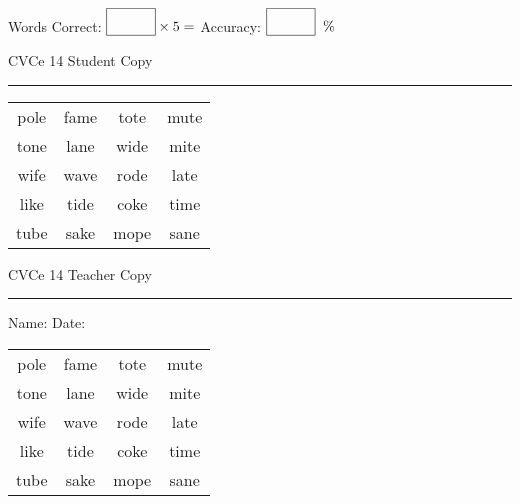 \documentclass{memoir}
\begin{document}
\small

Words Correct: $\fbox{\phantom{\huge 100}} \times 5 = $ Accuracy: $\fbox{\phantom{\huge 100}}\;\; \%$ 

\vfill

\newpage


\footnotesize \noindent
CVCe 14 \hfill Student Copy
\smallskip
\hrule

\Large

\setlength{\tabcolsep}{14pt}
\def\arraystretch{2}

{\selectfont


\begin{vplace}[0.5]
\begin{center}
\begin{tabular}{cccc}
pole & fame & tote & mute \\
tone & lane & wide & mite \\
wife & wave & rode & late \\
like & tide & coke & time \\
tube & sake & mope & sane \\
\end{tabular}
\end{center}
\end{vplace}

}

\newpage

\footnotesize \noindent
CVCe 14 \hfill Teacher Copy
\smallskip
\hrule

\small

\vfill

\noindent
Name: \underline{\hspace{1.75in}} \hfill Date: \underline{\hspace{1in}}

\Large

{\selectfont


\begin{vplace}[0.5]
\begin{center}
\begin{tabular}{cccc}
pole & fame & tote & mute \\
tone & lane & wide & mite \\
wife & wave & rode & late \\
like & tide & coke & time \\
tube & sake & mope & sane \\
\end{tabular}
\end{center}
\end{vplace}



}
\end{document}

